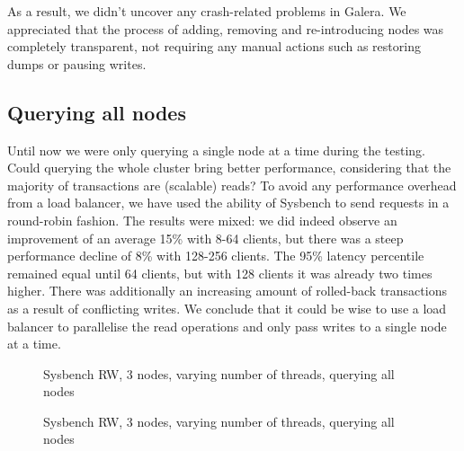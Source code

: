 \documentclass{sig-alternate}
\begin{document}
As a result, we didn't uncover any crash-related problems in Galera. We appreciated that the process of adding, removing and re-introducing nodes was completely transparent, not requiring any manual actions such as restoring dumps or pausing writes.

\subsection{Querying all nodes}

Until now we were only querying a single node at a time during the testing. Could querying the whole cluster bring better performance, considering that the majority of transactions are (scalable) reads? To avoid any performance overhead from a load balancer, we have used the ability of Sysbench to send requests in a round-robin fashion. The results were mixed: we did indeed observe an improvement of an average 15\% with 8-64 clients, but there was a steep performance decline of 8\% with 128-256 clients. The  95\% latency percentile remained equal until 64 clients, but with 128 clients it was already two times higher. There was additionally an increasing amount of rolled-back transactions as a result of conflicting writes. We conclude that it could be wise to use a load balancer to parallelise the read operations and only pass writes to a single node at a time.

\begin{figure}[h]
\centering
{}
\caption{Sysbench RW, 3 nodes, varying number of threads, querying all nodes}
\end{figure}

\begin{figure}[h]
\centering
{}
\caption{Sysbench RW, 3 nodes, varying number of threads, querying all nodes}
\end{figure}
\end{document}
